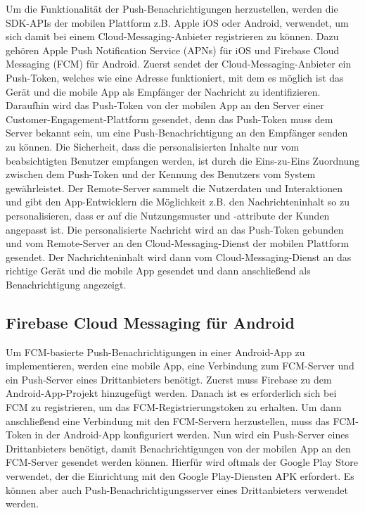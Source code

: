 \documentclass[sigconf]{acmart}
\begin{document}
Um die Funktionalität der Push-Benachrichtigungen herzustellen, 
werden die SDK-APIs der mobilen Plattform z.B. Apple iOS oder Android, 
verwendet, um sich damit bei einem Cloud-Messaging-Anbieter 
registrieren zu können. Dazu gehören Apple Push Notification Service 
(APNs) für iOS und Firebase Cloud Messaging (FCM) für Android.
Zuerst sendet der Cloud-Messaging-Anbieter ein Push-Token, welches wie 
eine Adresse funktioniert, mit dem es möglich ist das Gerät und die 
mobile App als Empfänger der Nachricht zu identifizieren.
Daraufhin wird das Push-Token von der mobilen App an den Server einer 
Customer-Engagement-Plattform gesendet, denn das Push-Token muss dem 
Server bekannt sein, um eine Push-Benachrichtigung an den Empfänger 
senden zu können.
Die Sicherheit, dass die personalisierten Inhalte nur vom 
beabsichtigten Benutzer empfangen werden, ist durch die Eins-zu-Eins 
Zuordnung zwischen dem Push-Token und der Kennung des Benutzers vom 
System gewährleistet.
Der Remote-Server sammelt die Nutzerdaten und Interaktionen und gibt 
den App-Entwicklern die Möglichkeit z.B. den Nachrichteninhalt so zu 
personalisieren, dass er auf die Nutzungsmuster und -attribute der 
Kunden angepasst ist.
Die personalisierte Nachricht wird an das Push-Token gebunden und 
vom Remote-Server an den Cloud-Messaging-Dienst der mobilen 
Plattform gesendet.
Der Nachrichteninhalt wird dann vom Cloud-Messaging-Dienst an das 
richtige Gerät und die mobile App gesendet und dann anschließend als 
Benachrichtigung angezeigt.\cite{agarwal}

\subsection{Firebase Cloud Messaging für Android}

Um FCM-basierte Push-Benachrichtigungen in einer 
Android-App zu implementieren, werden eine mobile App, eine Verbindung 
zum FCM-Server und ein Push-Server eines Drittanbieters benötigt.
Zuerst muss Firebase zu dem Android-App-Projekt hinzugefügt werden. 
Danach ist es erforderlich sich bei FCM zu registrieren, um das 
FCM-Registrierungstoken zu erhalten. Um dann anschließend eine 
Verbindung mit den FCM-Servern herzustellen, muss das FCM-Token 
in der Android-App konfiguriert werden. Nun wird ein Push-Server 
eines Drittanbieters benötigt, damit Benachrichtigungen von der 
mobilen App an den FCM-Server gesendet werden können.
Hierfür wird oftmals der Google Play Store verwendet, der die 
Einrichtung mit den Google Play-Diensten APK erfordert. Es können 
aber auch Push-Benachrichtigungsserver eines Drittanbieters verwendet 
werden.\cite{firebase}
\end{document}
